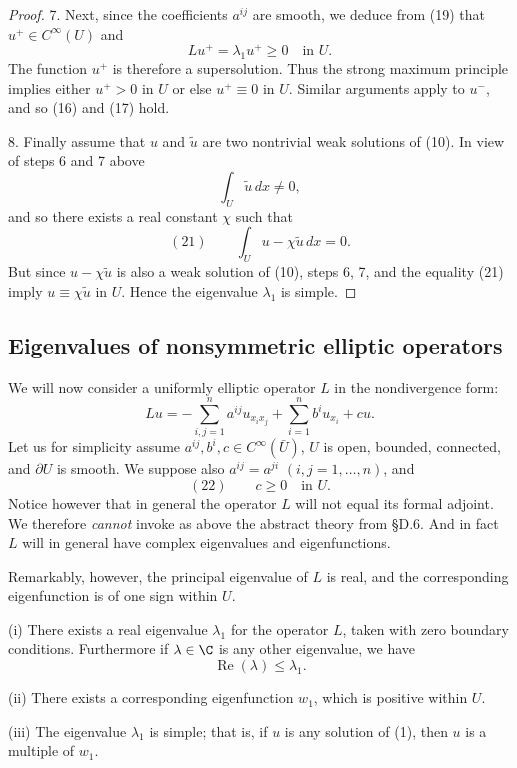 \begin{proof}
7. Next, since the coefficients $a^{ij}$ are smooth, we deduce from (19) that $u^+ \in C^\infty(U)$ and
$$Lu^+ = \lambda_1u^+ \geq 0 \quad \text{in } U.$$
The function $u^+$ is therefore a supersolution. Thus the strong maximum principle implies either $u^+ > 0$ in $U$ or else $u^+ \equiv 0$ in $U$. Similar arguments apply to $u^-$, and so (16) and (17) hold.

8. Finally assume that $u$ and $\tilde u$ are two nontrivial weak solutions of (10). In view of steps 6 and 7 above
$$\int_U \tilde u\,dx \neq 0,$$
and so there exists a real constant $\chi$ such that
$$(21) \qquad \int_U u - \chi\tilde u\,dx = 0.$$
But since $u - \chi\tilde u$ is also a weak solution of (10), steps 6, 7, and the equality (21) imply $u \equiv \chi\tilde u$ in $U$. Hence the eigenvalue $\lambda_1$ is simple.
\end{proof}

\subsection{Eigenvalues of nonsymmetric elliptic operators}

We will now consider a uniformly elliptic operator $L$ in the nondivergence form:
$$Lu = -\sum_{i,j=1}^n a^{ij}u_{x_ix_j} + \sum_{i=1}^n b^iu_{x_i} + cu.$$
Let us for simplicity assume $a^{ij}, b^i, c \in C^\infty(\bar U)$, $U$ is open, bounded, connected, and $\partial U$ is smooth. We suppose also $a^{ij} = a^{ji}$ $(i,j=1,\ldots,n)$, and
$$(22) \qquad c \geq 0 \quad \text{in } U.$$
Notice however that in general the operator $L$ will not equal its formal adjoint. We therefore \textit{cannot} invoke as above the abstract theory from \S D.6. And in fact $L$ will in general have complex eigenvalues and eigenfunctions.

Remarkably, however, the principal eigenvalue of $L$ is real, and the corresponding eigenfunction is of one sign within $U$.

\begin{theorem}
\label{thm:principal-eigenvalue-nonsymmetric-operator}
(i) There exists a real eigenvalue $\lambda_1$ for the operator $L$, taken with zero boundary conditions. Furthermore if $\lambda \in \C$ is any other eigenvalue, we have
$$\operatorname{Re}(\lambda) \leq \lambda_1.$$

(ii) There exists a corresponding eigenfunction $w_1$, which is positive within $U$.

(iii) The eigenvalue $\lambda_1$ is simple; that is, if $u$ is any solution of (1), then $u$ is a multiple of $w_1$.
\end{theorem}


